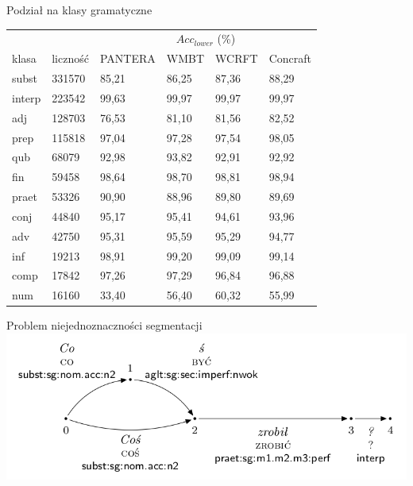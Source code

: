 \documentclass{beamer}
\begin{document}
\begin{frame}{Podział na klasy gramatyczne}
\begin{center}
\begin{tabular}{llllll}
 &  & \multicolumn{4}{c}{$Acc_{lower}$ (\%)} \\
klasa & liczność & PANTERA & WMBT & WCRFT & Concraft \\
\hline
subst & 331570 & 85,21 & 86,25 & 87,36 & 88,29 \\
interp & 223542 & 99,63 & 99,97 & 99,97 & 99,97 \\
adj & 128703 & 76,53 & 81,10 & 81,56 & 82,52 \\
prep & 115818 & 97,04 & 97,28 & 97,54 & 98,05 \\
qub & 68079 & 92,98 & 93,82 & 92,91 & 92,92 \\
fin & 59458 & 98,64 & 98,70 & 98,81 & 98,94 \\
praet & 53326 & 90,90 & 88,96 & 89,80 & 89,69 \\
conj & 44840 & 95,17 & 95,41 & 94,61 & 93,96 \\
adv & 42750 & 95,31 & 95,59 & 95,29 & 94,77 \\
inf & 19213 & 98,91 & 99,20 & 99,09 & 99,14 \\
comp & 17842 & 97,26 & 97,29 & 96,84 & 96,88 \\
num & 16160 & 33,40 & 56,40 & 60,32 & 55,99 \\
\end{tabular}
\end{center}
\end{frame}

\begin{frame}{Problem niejednoznaczności segmentacji}
  \\
  \includegraphics[width=\textwidth]{img/segm_amb1.png}
\end{frame}
\end{document}
